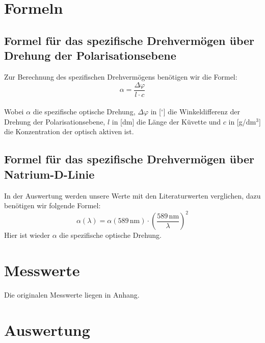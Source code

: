 \documentclass[fontsize=12pt]{scrartcl}
\begin{document}
\section{ Formeln}

\subsection{Formel für das spezifische Drehvermögen über Drehung der Polarisationsebene}

Zur Berechnung des spezifischen Drehvermögens benötigen wir die Formel:
\begin{equation}
\alpha = \frac{\Delta\varphi}{l \cdot c}
\end{equation}
\\
Wobei $\alpha$ die spezifische optische Drehung, $\Delta \varphi$ in [$^\circ$] die Winkeldifferenz der Drehung der Polarisationsebene, $l$ in [dm] die Länge der Küvette und $c$ in [g/dm$^3$] die Konzentration 
der optisch aktiven ist. \\

\subsection{Formel für das spezifische Drehvermögen über Natrium-D-Linie}
In der Auswertung werden unsere Werte mit den Literaturwerten verglichen, dazu benötigen wir folgende Formel:
\begin{equation}
\alpha(\lambda)=\alpha(589\,\text{nm})\cdot (\frac{589\,\text{nm}}{\lambda})^2
\end{equation}
Hier ist wieder $\alpha$ die spezifische optische Drehung.

\section{ Messwerte}

Die originalen Messwerte liegen in Anhang.

\newpage
\section{ Auswertung}
\end{document}
